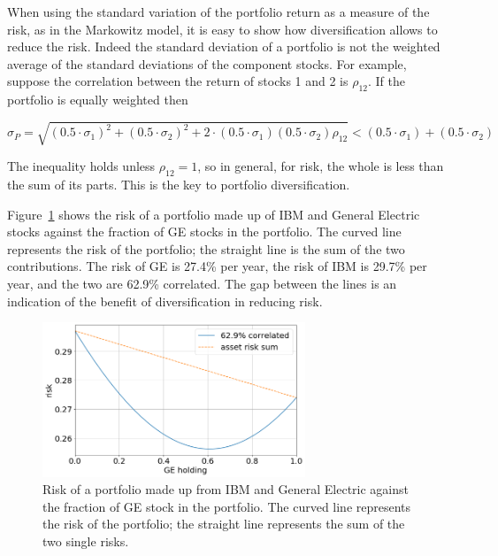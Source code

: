 When using the standard variation of the portfolio return as a measure of the risk, as in the Markowitz model, it is easy to show how diversification allows to reduce the risk. 
Indeed the standard deviation of a portfolio is not the weighted average of the standard deviations of the component stocks.
For example, suppose the correlation between the return of stocks 1 and 2 is $\rho_{12}$. If the portfolio is equally weighted then

\begin{equation}
\sigma_{P} = \sqrt{(0.5\cdot\sigma_1 )^2 + (0.5\cdot\sigma_2 )^2 + 2\cdot(0.5\cdot\sigma_1)(0.5\cdot\sigma_2)\rho_{12}} < (0.5\cdot\sigma_1 ) + (0.5\cdot\sigma_2 )
\end{equation}

The inequality holds unless $\rho_{12}=1$, so in general, for risk, the whole is less than the sum of its parts. 
This is the key to portfolio diversification.

Figure~\ref{fig:diversification} shows the risk of a portfolio made up of IBM and General Electric stocks against the fraction of GE stocks in the portfolio. The curved line represents the risk of the portfolio; the straight line is the sum of the two contributions. The risk of GE is 27.4\% per year, the risk of IBM is 29.7\% per year, and the two are 62.9\% correlated. The gap between the lines is an indication of the benefit of diversification in reducing risk.

\begin{figure}[htb]
\centering
\includegraphics[width=0.7\textwidth]{figures/diversification}
\caption{Risk of a portfolio made up from IBM and General Electric against the fraction of GE stock in the portfolio. The curved line represents the risk of the portfolio; the straight line represents the sum of the two single risks.}
\label{fig:diversification}
\end{figure}

